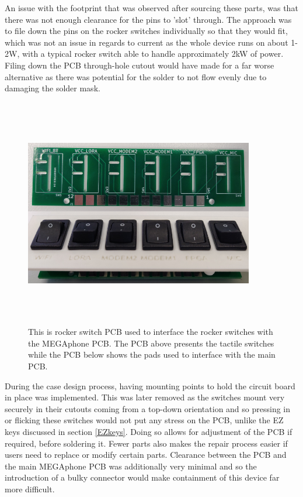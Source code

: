 An issue with the footprint that was observed after sourcing these parts, was that there was not enough clearance for the pins to 'slot' through.
The approach was to file down the pins on the rocker switches individually so that they would fit, which was not an issue in regards to current as the whole device runs on about 1-2W, with a typical rocker switch able to handle approximately 2kW of power.
Filing down the PCB through-hole cutout would have made for a far worse alternative as there was potential for the solder to not flow evenly due to damaging the solder mask. %

\begin{figure} [h]
    \centering
    \includegraphics[width=10cm,height=10cm,keepaspectratio]{Figures/rockerswitchpcb.png}
    \caption{This is rocker switch PCB used to interface the rocker switches with the MEGAphone PCB. The PCB above presents the tactile switches while the PCB below shows the pads used to interface with the main PCB.}
    \label{fig:Rocker}
\end{figure}

During the case design process, having mounting points to hold the circuit board in place was implemented.
This was later removed as the switches mount very securely in their cutouts coming from a top-down orientation and so pressing in or flicking these switches would not put any stress on the PCB, unlike the EZ keys discussed in section \ref{EZkeys}.
Doing so allows for adjustment of the PCB if required, before soldering it.
Fewer parts also makes the repair process easier if users need to replace or modify certain parts.
Clearance between the PCB and the main MEGAphone PCB was additionally very minimal and so the introduction of a bulky connector would make containment of this device far more difficult.

